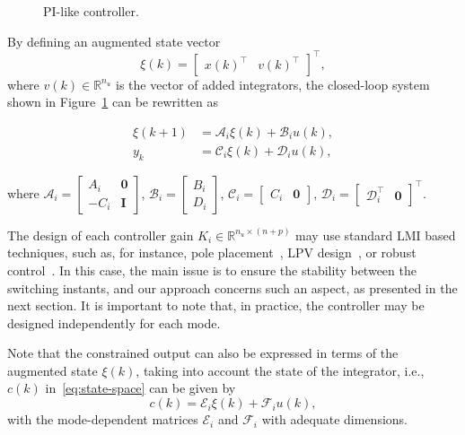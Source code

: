 \begin{figure}[!htb]
  \centering
  \resizebox{0.98\linewidth}{!}{}
  \caption{PI-like controller.}%
  \label{fig:pi-controller-diagram}
\end{figure}

By defining an augmented state vector
\[
  \xi(k)=\begin{bmatrix}{x(k)}^\top &v{(k)}^\top\end{bmatrix}^\top,
\]
where \(v(k)\in\mathbb{R}^{n_u}\) is the vector of added integrators, the
closed-loop system shown in Figure~\ref{fig:pi-controller-diagram} can be
rewritten as

\begin{equation}
  \label{sistemaaum}
  \begin{split}
    \xi(k+1) &= \mathcal{A}_i\xi(k)+\mathcal{B}_{i}u(k), \\
    y_{k}    &= \mathcal{C}_i\xi(k)+\mathcal{D}_{i}u(k),
  \end{split}
\end{equation}

where \(\mathcal{A}_i=\begin{bmatrix}A_i & \textbf{0} \\-C_{i}&\textbf{I}
\end{bmatrix} \), \(\mathcal{B}_i=\begin{bmatrix}B_i\\D_i\end{bmatrix}\),
\(\mathcal{C}_i=\begin{bmatrix} C_i & \textbf{0} \end{bmatrix}\),
\(\mathcal{D}_i=\begin{bmatrix}\mathcal{D}_i^\top&\textbf{0}\end{bmatrix}^\top\).

The design of each controller gain \(K_i\in\mathbb{R}^{n_u\times{}(n+p)}\) may use
standard LMI based techniques, such as, for instance, pole
placement~\parencite{yu:lmis}, LPV design~\parencite{briat:linear}, or robust
control~\parencite{boyd.ghaoui.ea:linear}. In this case, the main issue is to
ensure the stability between the switching instants, and our approach concerns
such an aspect, as presented in the next section. It is important to note that,
in practice, the controller may be designed independently for each mode.

Note that the constrained output can also be expressed in terms of the augmented
state \(\xi(k)\), taking into account the state of the integrator, i.e., \(c(k)\)
in~\eqref{eq:state-space} can be given by
%
\begin{equation}
  \label{eq:constrained-output}
  c(k) = \mathcal{E}_i\xi(k) + \mathcal{F}_i u(k),
\end{equation}
%
with the mode-dependent matrices \(\mathcal{E}_i\) and \(\mathcal{F}_i\) with
adequate dimensions.

